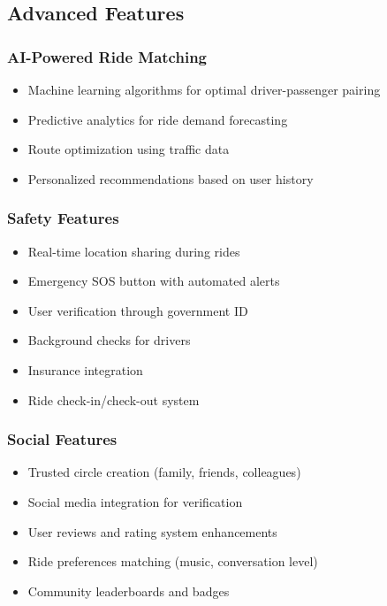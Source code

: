 \documentclass[12pt,a4paper]{article}
\begin{document}
\subsection{Advanced Features}

\subsubsection{AI-Powered Ride Matching}
\begin{itemize}
    \item Machine learning algorithms for optimal driver-passenger pairing
    \item Predictive analytics for ride demand forecasting
    \item Route optimization using traffic data
    \item Personalized recommendations based on user history
\end{itemize}

\subsubsection{Safety Features}
\begin{itemize}
    \item Real-time location sharing during rides
    \item Emergency SOS button with automated alerts
    \item User verification through government ID
    \item Background checks for drivers
    \item Insurance integration
    \item Ride check-in/check-out system
\end{itemize}

\subsubsection{Social Features}
\begin{itemize}
    \item Trusted circle creation (family, friends, colleagues)
    \item Social media integration for verification
    \item User reviews and rating system enhancements
    \item Ride preferences matching (music, conversation level)
    \item Community leaderboards and badges
\end{itemize}
\end{document}
